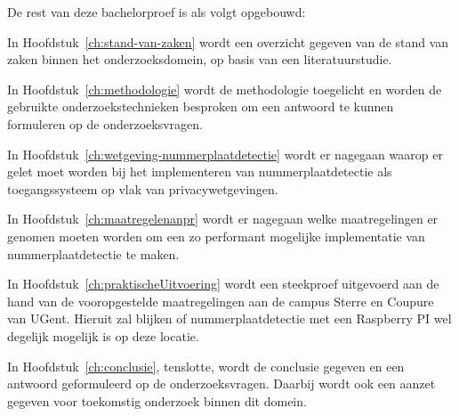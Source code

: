 
De rest van deze bachelorproef is als volgt opgebouwd:

In Hoofdstuk~\ref{ch:stand-van-zaken} wordt een overzicht gegeven van de stand van zaken binnen het onderzoeksdomein, op basis van een literatuurstudie.

In Hoofdstuk~\ref{ch:methodologie} wordt de methodologie toegelicht en worden de gebruikte onderzoekstechnieken besproken om een antwoord te kunnen formuleren op de onderzoeksvragen.

In Hoofdstuk~\ref{ch:wetgeving-nummerplaatdetectie} wordt er nagegaan waarop er gelet moet worden bij het implementeren van nummerplaatdetectie als toegangssysteem op vlak van privacywetgevingen.

In Hoofdstuk~\ref{ch:maatregelenanpr} wordt er nagegaan welke maatregelingen er genomen moeten worden om een zo performant mogelijke implementatie van nummerplaatdetectie te maken.

In Hoofdstuk~\ref{ch:praktischeUitvoering} wordt een steekproef uitgevoerd aan de hand van de vooropgestelde maatregelingen aan de campus Sterre en Coupure van UGent. Hieruit zal blijken of nummerplaatdetectie met een Raspberry PI wel degelijk mogelijk is op deze locatie.

In Hoofdstuk~\ref{ch:conclusie}, tenslotte, wordt de conclusie gegeven en een antwoord geformuleerd op de onderzoeksvragen. Daarbij wordt ook een aanzet gegeven voor toekomstig onderzoek binnen dit domein.
